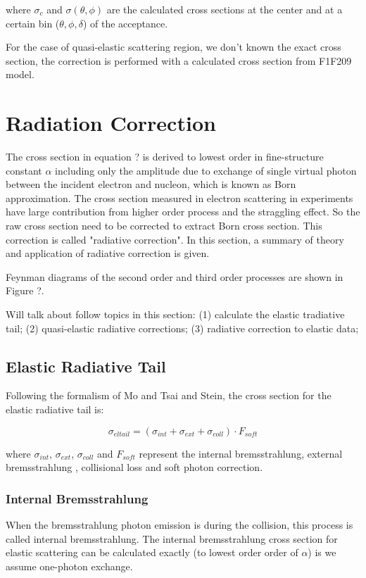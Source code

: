 where $\sigma_c$ and $\sigma(\theta,\phi)$ are the calculated cross sections at the center and at a certain bin ($\theta,
\phi, \delta$) of the acceptance.

For the case of quasi-elastic scattering region, we don't known the exact cross section, the correction is performed
with a calculated cross section from F1F209 model.

\section{Radiation Correction}
The cross section in equation ? is derived to lowest order in fine-structure
constant $\alpha$ including only the amplitude due to exchange of single virtual photon between 
the incident electron and nucleon, which is known as Born approximation. The cross section measured
in electron scattering in experiments have large contribution from higher order process and the 
straggling effect. So the raw cross section need to be corrected to extract Born cross section.
This correction is called "radiative correction". 
In this section, a summary of theory and application of radiative correction is given.

Feynman diagrams of the second order and third order processes are shown in Figure ?.

Will talk about follow topics in this section:
(1) calculate the elastic tradiative tail; (2) quasi-elastic radiative corrections;
(3) radiative correction to elastic data;

\subsection{Elastic Radiative Tail}
Following the formalism of Mo and Tsai and Stein, the cross section for the elastic radiative tail is:

\begin{equation}
\sigma_{el tail} = (\sigma_{int} + \sigma_{ext} + \sigma_{coll}) \cdot F_{soft}
\end{equation}

where $\sigma_{int}$, $\sigma_{ext}$, $\sigma_{coll}$ and $F_{soft}$ represent the internal bremsstrahlung, external bremsstrahlung
, collisional loss and soft photon correction.

\subsubsection{Internal Bremsstrahlung}
When the bremsstrahlung photon emission is during the collision, this process is called internal bremsstrahlung. The
internal bremsstrahlung cross section for elastic scattering can be calculated exactly (to lowest order order of
$\alpha$) is we assume one-photon exchange.


